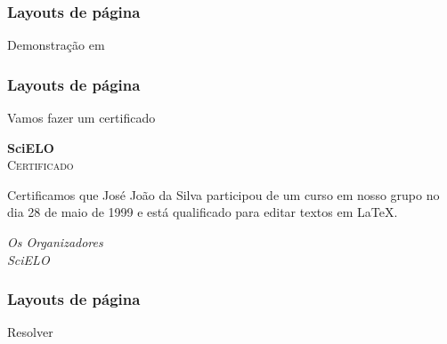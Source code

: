 \begin{frame}
  \frametitle{Layouts de página}
  \huge
  Demonstração em 
\end{frame}

\begin{frame}
  \frametitle{Layouts de página}
  \Huge
  Vamos fazer um certificado
\end{frame}

\begin{frame}[plain]

  {\huge\textbf{SciELO}}\\[2em]
  {\LARGE\textsc{Certificado}}

  \noindent Certificamos que José João da Silva participou de um curso em nosso
  grupo no dia 28 de maio de 1999 e está qualificado para editar textos em
  \LaTeX.

  \vfill
  \emph{Os Organizadores}\\
  \emph{SciELO}

\end{frame}

\begin{frame}
  \frametitle{Layouts de página}
  \huge
  Resolver 
\end{frame}
